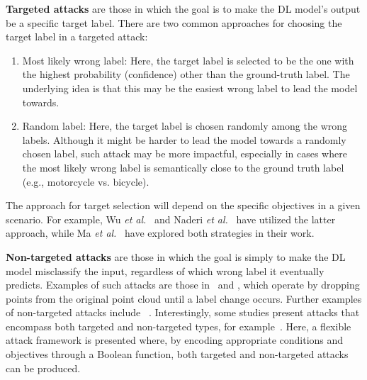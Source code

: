 \documentclass{ieeeaccess}
\def\etal{\textit{et al.}}
\begin{document}
\textbf{Targeted attacks} are those in which the goal is to make the DL model's output be a specific target label. There are two common approaches for choosing the target label in a targeted attack: 
\begin{enumerate}
    \item Most likely wrong label: Here, the target label is selected to be the one with the highest probability (confidence) other than the ground-truth label. The underlying idea is that this may be the easiest wrong label to lead the model towards.  
    \item Random label: Here, the target label is chosen randomly among the wrong labels. Although it might be harder to lead the model towards a randomly chosen label, such attack may be more impactful, especially in cases where the most likely wrong label is semantically close to the ground truth label (e.g., motorcycle vs. bicycle).
\end{enumerate}
The approach for target selection will depend on the specific objectives in a given scenario. For example, Wu \etal~\cite{wu2020if} and Naderi \etal~\cite{naderi2023lpf} have utilized the latter approach, while Ma \etal~\cite{ma2020efficient} have explored both strategies in their work.
 
\textbf{Non-targeted attacks} are those in which the goal is simply to make the DL model misclassify the input, regardless of which wrong label it eventually predicts. Examples of such attacks are those in~\cite{zheng2019pointcloud} and \cite{yang2019adversarial}, which operate by dropping points from the original point cloud until a label change occurs. Further examples of non-targeted attacks include ~\cite{hamdi2020advpc,lee2020shapeadv,zhou2020lg,wen2020geometry}. Interestingly, some studies present attacks that encompass both targeted and non-targeted types, for example~\cite{wicker2019robustness}. Here, a flexible attack framework is presented where, by encoding appropriate conditions and objectives through a Boolean function, both targeted and non-targeted attacks can be produced.

\end{document}
